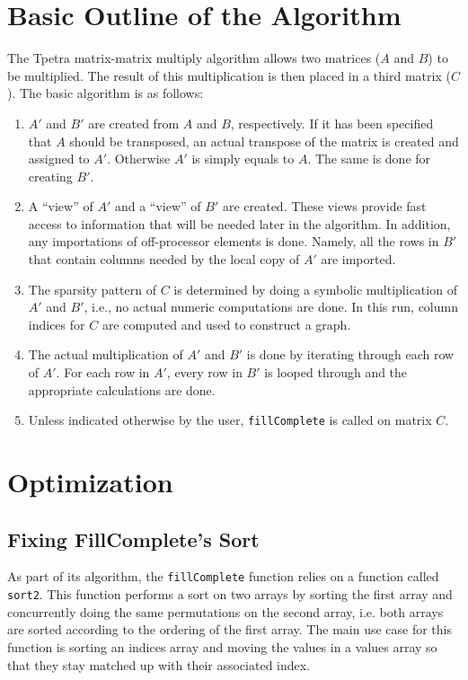 \documentclass[pdf,12pt, strict]{SANDreport}
\newcommand{\Aprime}{\ensuremath{A'}\xspace}
\newcommand{\Bprime}{\ensuremath{B'}\xspace}
\begin{document}
\section{Basic Outline of the Algorithm}
The Tpetra matrix-matrix multiply algorithm allows two matrices ($A$ and $B$) to be multiplied. The result of this 
multiplication is then placed in a third matrix ($C$).
The basic algorithm is as follows:
\begin{enumerate}
  \item \Aprime and \Bprime are created from $A$ and $B$, respectively. If it has been specified that $A$ should be transposed, an actual 
  transpose of the matrix is created and assigned to \Aprime. Otherwise \Aprime is simply equals to $A$. The same is done for 
  creating \Bprime.
  \item A ``view'' of \Aprime and a ``view'' of \Bprime are created. These views provide fast access to information that 
  will be needed later in the algorithm. In addition, any importations of off-processor elements is done. Namely, all the 
  rows in \Bprime that contain columns needed by the local copy of \Aprime are imported.
  \item The sparsity pattern of $C$ is determined by doing a symbolic multiplication of \Aprime and \Bprime, i.e., no actual
  numeric computations are done. In this run, 
  column indices for $C$ are computed and used to construct a graph.
  \item The actual multiplication of \Aprime and \Bprime is done by iterating through each row of \Aprime. For each row in 
  \Aprime, every row in \Bprime is looped through and the appropriate calculations are done.
  \item Unless indicated otherwise by the user, \verb!fillComplete! is called on matrix $C$.
\end{enumerate}

\section{Optimization}

\subsection{Fixing FillComplete's Sort}
As part of its algorithm, the \verb!fillComplete! function relies on a function called \verb!sort2!. This function performs a sort 
on two arrays by sorting the first array and concurrently doing the same permutations on the second array, 
i.e. both arrays are sorted according to the ordering of the first array. The main use case for this function is sorting 
an indices array and moving the values in a values array so that they stay matched up with their associated index.
\end{document}
